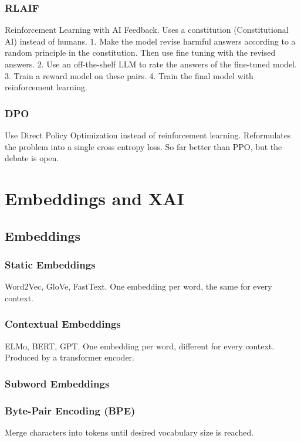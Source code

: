 \documentclass{scrartcl}
\begin{document}
\subsubsection*{RLAIF}
Reinforcement Learning with AI Feedback.
Uses a constitution (Constitutional AI) instead of humans.
1. Make the model revise harmful answers according to a random principle in the constitution. Then use fine tuning with the revised answers.
2. Use an off-the-shelf LLM to rate the answers of the fine-tuned model.
3. Train a reward model on these pairs.
4. Train the final model with reinforcement learning.

\subsubsection*{DPO}
Use Direct Policy Optimization instead of reinforcement learning.
Reformulates the problem into a single cross entropy loss.
So far better than PPO, but the debate is open.


\section{Embeddings and XAI}

\subsection*{Embeddings}
\subsubsection*{Static Embeddings}
Word2Vec, GloVe, FastText.
One embedding per word, the same for every context.

\subsubsection*{Contextual Embeddings}
ELMo, BERT, GPT.
One embedding per word, different for every context.
Produced by a transformer encoder.

\subsubsection*{Subword Embeddings}
\subsubsection*{Byte-Pair Encoding (BPE)}
Merge characters into tokens until desired vocabulary size is reached.
\end{document}
